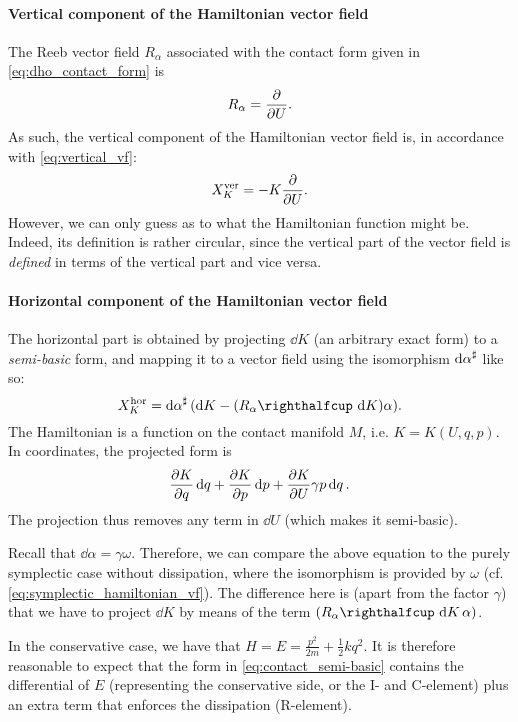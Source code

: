 \paragraph{Vertical component of the Hamiltonian vector field} The Reeb vector field \(R_\alpha\) associated with the contact form given in \cref{eq:dho_contact_form} is 
\begin{equation}
     R_\alpha = \pdv{}{U}.
\end{equation}
As such, the vertical component of the Hamiltonian vector field is, in accordance with \cref{eq:vertical_vf}:
\begin{equation}
    X_K^\text{ver} = -K\pdv{}{U}.
    \label{eq:dho_vertical}
\end{equation}
However, we can only guess as to what the Hamiltonian function might be. Indeed, its definition is rather circular, since the vertical part of the vector field is \emph{defined} in terms of the vertical part and vice versa.

\paragraph{Horizontal component of the Hamiltonian vector field} The horizontal part is obtained by projecting \(\dd{K}\) (an arbitrary exact form) to a \emph{semi-basic} form, and mapping it to a vector field using the isomorphism \(\dd{\alpha}^\sharp\) like so:
\begin{equation}
     X_K^\text{hor} = \fromDual{\dd{\alpha}}(\dd{K} - \qty(\intpr{R_\alpha}{\dd{K}})\alpha).
\end{equation}
The Hamiltonian is a function on the contact manifold \(M\), i.e. \(K = K(U, q, p)\). In coordinates, the projected form is
\begin{equation}
    \pdv{K}{q}\dd{q} + \pdv{K}{p}\dd{p} + \pdv{K}{U} \gamma p \dd{q}.
    \label{eq:contact_semi-basic}
\end{equation}
The projection thus removes any term in \(\dd{U}\) (which makes it semi-basic).

Recall that \(\dd{\alpha} = \gamma \omega \). Therefore, we can compare the above equation to the purely symplectic case without dissipation, where the isomorphism is provided by \(\omega\) (cf. \cref{eq:symplectic_hamiltonian_vf}). The difference here is (apart from the factor \(\gamma\)) that we have to project \(\dd{K}\) by means of the term \(\qty(\intpr{R_\alpha}{\dd{K}}\alpha)\).

In the conservative case, we have that \(H = E = \frac{p^2}{2m} + \frac{1}{2}kq^2\). It is therefore reasonable to expect that the form in \cref{eq:contact_semi-basic} contains the differential of \(E\) (representing the conservative side, or the I- and C-element) plus an extra term that enforces the dissipation (R-element). 

